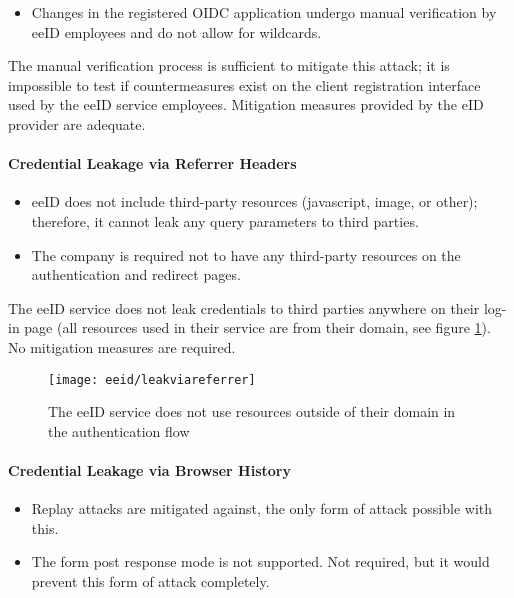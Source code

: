\begin{itemize}
  \item Changes in the registered OIDC application undergo manual verification by eeID employees and do not allow for wildcards.
\end{itemize}

The manual verification process is sufficient to mitigate this attack; it is impossible to test if countermeasures exist on the client registration interface used by the eeID service employees. Mitigation measures provided by the eID provider are adequate.

\paragraph{Credential Leakage via Referrer Headers}

\begin{itemize}
  \item eeID does not include third-party resources (javascript, image, or other); therefore, it cannot leak any query parameters to third parties.
  \item The company is required not to have any third-party resources on the authentication and redirect pages.
\end{itemize}

The eeID service does not leak credentials to third parties anywhere on their log-in page (all resources used in their service are from their domain, see figure \ref{fig:eeid-leakviareferrer}). No mitigation measures are required.

\begin{figure}
  \centering
  \texttt{[image: eeid/leakviareferrer]}
  \caption{The eeID service does not use resources outside of their domain in the authentication flow}
  \label{fig:eeid-leakviareferrer}
\end{figure}

\paragraph{Credential Leakage via Browser History}

\begin{itemize}
  \item Replay attacks are mitigated against, the only form of attack possible with this.
  \item The {form post} response mode is not supported. Not required, but it would prevent this form of attack completely.
\end{itemize}

